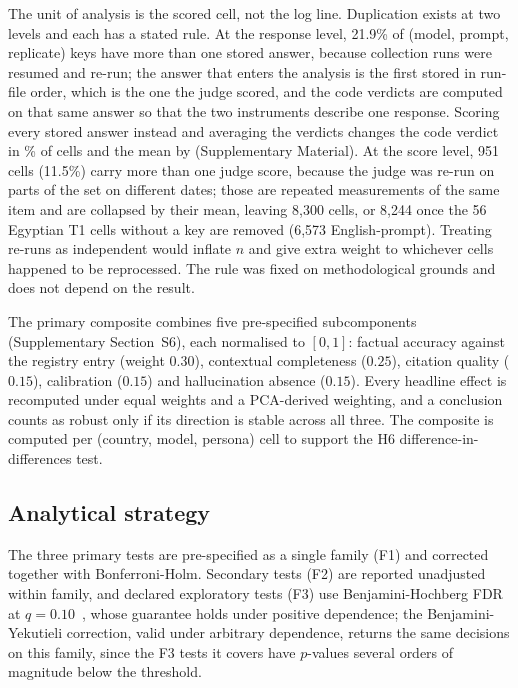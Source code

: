 The unit of analysis is the scored cell, not the log line. Duplication exists at
two levels and each has a stated rule. At the response level, 21.9\% of (model,
prompt, replicate) keys have more than one stored answer, because collection
runs were resumed and re-run; the answer that enters the analysis is the first
stored in run-file order, which is the one the judge scored, and the code
verdicts are computed on that same answer so that the two instruments describe
one response. Scoring every stored answer instead and averaging the verdicts
changes the code verdict in \ndupchange\% of cells and the mean by \ndupmean
(Supplementary Material). At the score level, 951 cells (11.5\%) carry more
than one judge score, because the judge was re-run on parts of the set on
different dates; those are repeated measurements of the same item and are
collapsed by their mean, leaving 8{,}300 cells, or 8{,}244 once the 56 Egyptian
T1 cells without a key are removed (6{,}573 English-prompt). Treating re-runs
as independent would inflate $n$ and give extra weight to whichever cells
happened to be reprocessed. The rule was fixed on methodological grounds and
does not depend on the result.

The primary composite combines five pre-specified subcomponents (Supplementary
Section~S6), each normalised to $[0,1]$: factual accuracy against the registry
entry (weight $0.30$), contextual completeness ($0.25$), citation quality
($0.15$), calibration ($0.15$) and hallucination absence ($0.15$). Every
headline effect is recomputed under equal weights and a PCA-derived weighting,
and a conclusion counts as robust only if its direction is stable across all
three. The composite is computed per (country, model, persona) cell to support
the H6 difference-in-differences test.

\subsection{Analytical strategy}

The three primary tests are pre-specified as a single family (F1) and corrected
together with Bonferroni-Holm. Secondary tests (F2) are reported unadjusted
within family, and declared exploratory tests (F3) use Benjamini-Hochberg FDR
at $q=0.10$~\citep{benjamini1995fdr}, whose guarantee holds under positive
dependence; the Benjamini-Yekutieli correction, valid under arbitrary
dependence, returns the same decisions on this family, since the F3 tests it
covers have $p$-values several orders of magnitude below the threshold.

